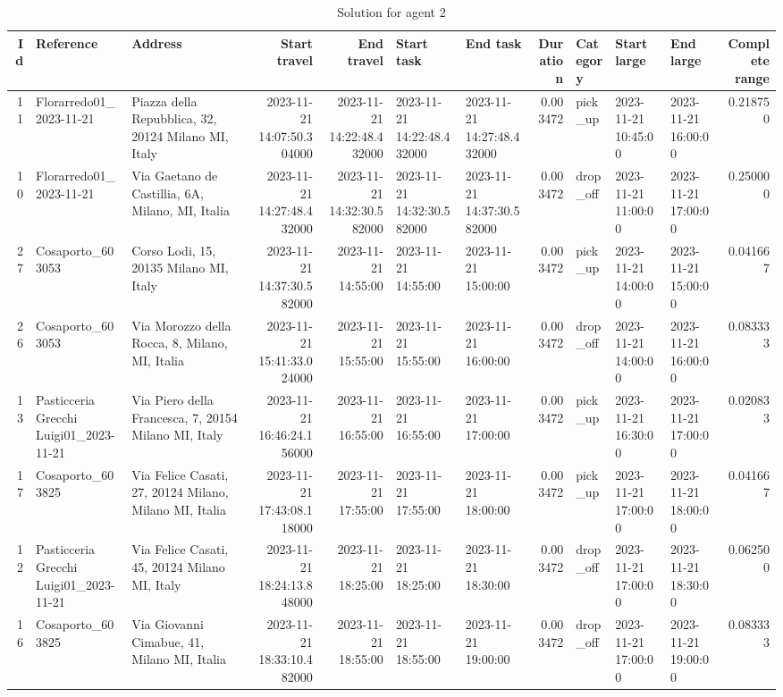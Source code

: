 \documentclass[titlepage]{article}
\begin{document}
\begin{table}[H]
\centering
\begin{adjustbox}{max width=\textwidth}
\begin{tabular}{rllrrllrlllr}
\toprule
Id & Reference & Address & Start travel & End travel & Start task & End task & Duration & Category & Start large & End large & Complete range \\
\midrule
11 & Florarredo01\_2023-11-21 & Piazza della Repubblica, 32, 20124 Milano MI, Italy & 2023-11-21 14:07:50.304000 & 2023-11-21 14:22:48.432000 & 2023-11-21 14:22:48.432000 & 2023-11-21 14:27:48.432000 & 0.003472 & pick\_up & 2023-11-21 10:45:00 & 2023-11-21 16:00:00 & 0.218750 \\
10 & Florarredo01\_2023-11-21 & Via Gaetano de Castillia, 6A, Milano, MI, Italia & 2023-11-21 14:27:48.432000 & 2023-11-21 14:32:30.582000 & 2023-11-21 14:32:30.582000 & 2023-11-21 14:37:30.582000 & 0.003472 & drop\_off & 2023-11-21 11:00:00 & 2023-11-21 17:00:00 & 0.250000 \\
27 & Cosaporto\_603053 & Corso Lodi, 15, 20135 Milano MI, Italy & 2023-11-21 14:37:30.582000 & 2023-11-21 14:55:00 & 2023-11-21 14:55:00 & 2023-11-21 15:00:00 & 0.003472 & pick\_up & 2023-11-21 14:00:00 & 2023-11-21 15:00:00 & 0.041667 \\
26 & Cosaporto\_603053 & Via Morozzo della Rocca, 8, Milano, MI, Italia & 2023-11-21 15:41:33.024000 & 2023-11-21 15:55:00 & 2023-11-21 15:55:00 & 2023-11-21 16:00:00 & 0.003472 & drop\_off & 2023-11-21 14:00:00 & 2023-11-21 16:00:00 & 0.083333 \\
13 & Pasticceria Grecchi Luigi01\_2023-11-21 & Via Piero della Francesca, 7, 20154 Milano MI, Italy & 2023-11-21 16:46:24.156000 & 2023-11-21 16:55:00 & 2023-11-21 16:55:00 & 2023-11-21 17:00:00 & 0.003472 & pick\_up & 2023-11-21 16:30:00 & 2023-11-21 17:00:00 & 0.020833 \\
17 & Cosaporto\_603825 & Via Felice Casati, 27, 20124 Milano, Milano MI, Italia & 2023-11-21 17:43:08.118000 & 2023-11-21 17:55:00 & 2023-11-21 17:55:00 & 2023-11-21 18:00:00 & 0.003472 & pick\_up & 2023-11-21 17:00:00 & 2023-11-21 18:00:00 & 0.041667 \\
12 & Pasticceria Grecchi Luigi01\_2023-11-21 & Via Felice Casati, 45, 20124 Milano MI, Italy & 2023-11-21 18:24:13.848000 & 2023-11-21 18:25:00 & 2023-11-21 18:25:00 & 2023-11-21 18:30:00 & 0.003472 & drop\_off & 2023-11-21 17:00:00 & 2023-11-21 18:30:00 & 0.062500 \\
16 & Cosaporto\_603825 & Via Giovanni Cimabue, 41, Milano MI, Italia & 2023-11-21 18:33:10.482000 & 2023-11-21 18:55:00 & 2023-11-21 18:55:00 & 2023-11-21 19:00:00 & 0.003472 & drop\_off & 2023-11-21 17:00:00 & 2023-11-21 19:00:00 & 0.083333 \\
\bottomrule
\end{tabular}
\end{adjustbox}
\caption{Solution for agent 2}
\label{tab:solution2}
\end{table}
\end{document}
